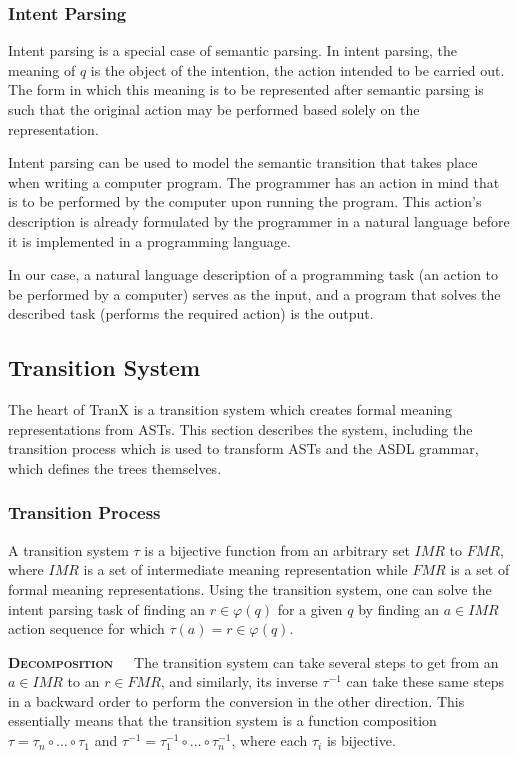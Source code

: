 \subsubsection{Intent Parsing}

Intent parsing is a special case of semantic parsing. In intent parsing,
the meaning of \(q\) is the object of the intention, the action intended
to be carried out. The form in which this meaning is to be represented
after semantic parsing is such that the original action may be performed
based solely on the representation.

Intent parsing can be used to model the semantic transition that takes
place when writing a computer program. The programmer has an action in
mind that is to be performed by the computer upon running the program.
This action's description is already formulated by the programmer in a
natural language before it is implemented in a programming language.

In our case, a natural language description of a programming task
(an action to be performed by a computer) serves as the input, and
a program that solves the described task (performs the required
action) is the output.

\subsection{Transition System}

The heart of TranX is a transition system which creates formal meaning
representations from ASTs. This section describes the system, including
the transition process which is used to transform ASTs and the ASDL
grammar, which defines the trees themselves.

\subsubsection{Transition Process}

A transition system \(\tau\) is a bijective function from an arbitrary set
\(IMR\) to \(FMR\), where \(IMR\) is a set of intermediate meaning 
representation while \(FMR\) is a set of formal meaning representations.
Using the transition system, one can solve the intent parsing task
of finding an \(r \in \varphi(q)\) for a given \(q\) by finding an
\(a \in IMR\) action sequence for which \(\tau(a) = r \in \varphi(q)\). 

\textbf{\textsc{Decomposition}}\ \ \ The transition system can take
several steps to get from an \(a \in IMR\) to an \(r \in FMR\), and
similarly, its inverse \(\tau^{-1}\) can take these same steps in a
backward order to perform the conversion in the other direction.
This essentially means that the transition system is a function composition
\(\tau = \tau_{n} \circ \dots \circ \tau_{1}\) and \(\tau^{-1} = 
\tau_{1}^{-1} \circ \dots \circ \tau_{n}^{-1}\), where each \(\tau_{i}\)
is bijective.

